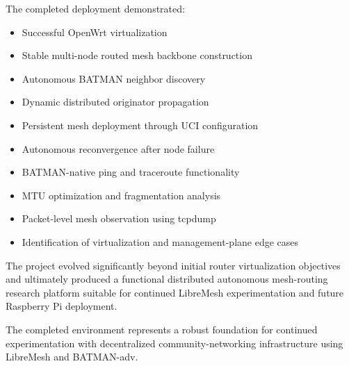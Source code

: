 \documentclass[conference]{IEEEtran}
\begin{document}
The completed deployment demonstrated:

\begin{itemize}
    \item Successful OpenWrt virtualization
    \item Stable multi-node routed mesh backbone construction
    \item Autonomous BATMAN neighbor discovery
    \item Dynamic distributed originator propagation
    \item Persistent mesh deployment through UCI configuration
    \item Autonomous reconvergence after node failure
    \item BATMAN-native ping and traceroute functionality
    \item MTU optimization and fragmentation analysis
    \item Packet-level mesh observation using tcpdump
    \item Identification of virtualization and management-plane edge cases
\end{itemize}

The project evolved significantly beyond initial router virtualization objectives and ultimately produced a functional distributed autonomous mesh-routing research platform suitable for continued LibreMesh experimentation and future Raspberry Pi deployment.

The completed environment represents a robust foundation for continued experimentation with decentralized community-networking infrastructure using LibreMesh and BATMAN-adv.


\end{document}
